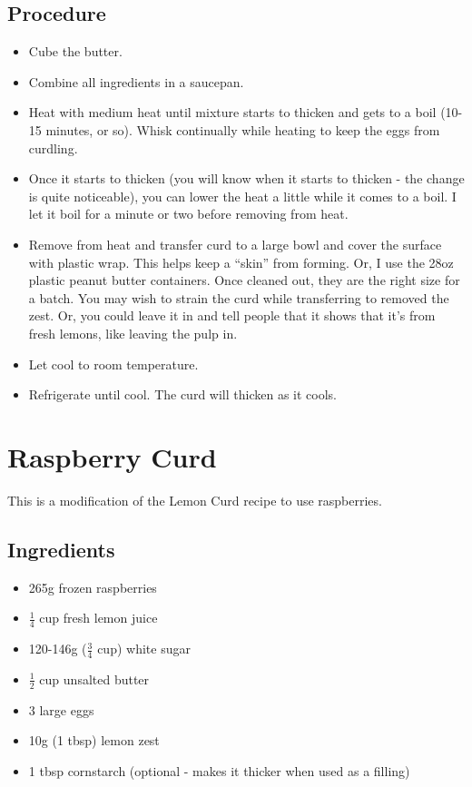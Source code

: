 \documentclass[10pt, openany]{book}
\begin{document}
\subsection{Procedure}
\begin{itemize}
  \item Cube the butter.
  \item Combine all ingredients in a saucepan.
  \item Heat with medium heat until mixture starts to thicken and gets to a boil (10-15 minutes, or so).  Whisk continually while heating to keep the eggs from curdling.
  \item Once it starts to thicken (you will know when it starts to thicken - the change is quite noticeable), you can lower the heat a little while it comes to a boil.  I let it boil for a minute or two before removing from heat.
  \item Remove from heat and transfer curd to a large bowl and cover the surface with plastic wrap.  This helps keep a ``skin'' from forming.  Or, I use the 28oz plastic peanut butter containers.  Once cleaned out, they are the right size for a batch.  You may wish to strain the curd while transferring to removed the zest.  Or, you could leave it in and tell people that it shows that it's from fresh lemons, like leaving the pulp in.
  \item Let cool to room temperature.
  \item Refrigerate until cool.  The curd will thicken as it cools.
\end{itemize}

\section{Raspberry Curd}
\label{extra:RaspberryCurd|}
This is a modification of the Lemon Curd recipe to use raspberries.

\subsection{Ingredients}
\begin{itemize}
  \item 265g frozen raspberries
  \item $\frac{1}{4}$ cup fresh lemon juice
  \item 120-146g ($\frac{3}{4}$ cup) white sugar
  \item $\frac{1}{2}$ cup unsalted butter
  \item 3 large eggs
  \item 10g (1 tbsp) lemon zest
  \item 1 tbsp cornstarch (optional - makes it thicker when used as a filling)
\end{itemize}
\end{document}
